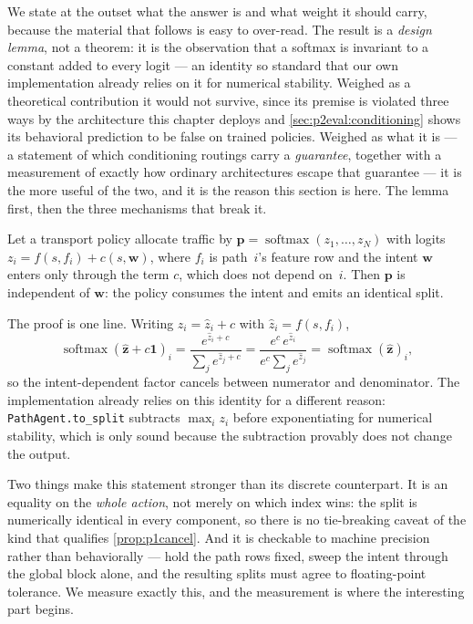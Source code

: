 We state at the outset what the answer is and what weight it should carry, because the material that
follows is easy to over-read. The result is a \emph{design lemma}, not a theorem: it is the observation
that a softmax is invariant to a constant added to every logit --- an identity so standard that our own
implementation already relies on it for numerical stability. Weighed as a theoretical contribution it
would not survive, since its premise is violated three ways by the architecture this chapter deploys and
\cref{sec:p2eval:conditioning} shows its behavioral prediction to be false on trained policies. Weighed
as what it is --- a statement of which conditioning routings carry a \emph{guarantee}, together with a
measurement of exactly how ordinary architectures escape that guarantee --- it is the more useful of the
two, and it is the reason this section is here. The lemma first, then the three mechanisms that break
it.

\begin{proposition}
\label{prop:p2cancel}
Let a transport policy allocate traffic by $\mathbf{p} = \operatorname{softmax}(z_1,\dots,z_N)$ with
logits $z_i = f(s, f_i) + c(s, \mathbf{w})$, where $f_i$ is path~$i$'s feature row and the intent
$\mathbf{w}$ enters only through the term $c$, which does not depend on~$i$. Then $\mathbf{p}$ is
independent of $\mathbf{w}$: the policy consumes the intent and emits an identical split.
\end{proposition}

\noindent The proof is one line. Writing $z_i = \hat{z}_i + c$ with $\hat{z}_i = f(s,f_i)$,
\begin{equation}
\operatorname{softmax}(\hat{\mathbf{z}} + c\mathbf{1})_i
  = \frac{e^{\hat{z}_i + c}}{\sum_j e^{\hat{z}_j + c}}
  = \frac{e^{c}\,e^{\hat{z}_i}}{e^{c}\sum_j e^{\hat{z}_j}}
  = \operatorname{softmax}(\hat{\mathbf{z}})_i ,
\label{eq:p2softmaxshift}
\end{equation}
so the intent-dependent factor cancels between numerator and denominator. The implementation already
relies on this identity for a different reason: \texttt{PathAgent.to\_split} subtracts
$\max_i z_i$ before exponentiating for numerical stability, which is only sound because the subtraction
provably does not change the output.

Two things make this statement stronger than its discrete counterpart. It is an equality on the
\emph{whole action}, not merely on which index wins: the split is numerically identical in every
component, so there is no tie-breaking caveat of the kind that qualifies \cref{prop:p1cancel}. And it is
checkable to machine precision rather than behaviorally --- hold the path rows fixed, sweep the intent
through the global block alone, and the resulting splits must agree to floating-point tolerance. We
measure exactly this, and the measurement is where the interesting part begins.

